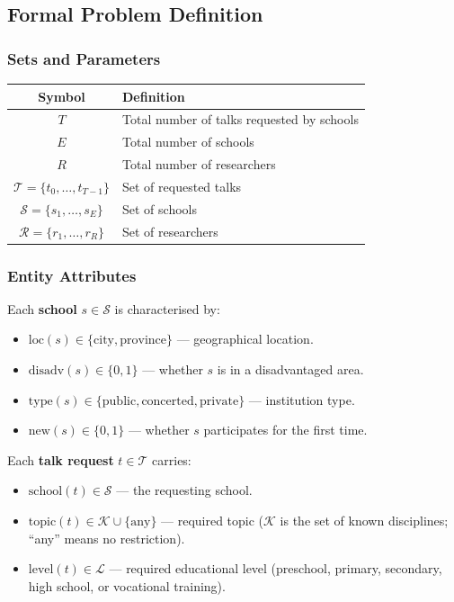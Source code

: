 \documentclass[12pt, a4paper]{article}
\begin{document}
\subsection{Formal Problem Definition}

\subsubsection{Sets and Parameters}

\begin{center}
\renewcommand{\arraystretch}{1.3}
\begin{tabular}{cl}
  \toprule
  \textbf{Symbol} & \textbf{Definition} \\
  \midrule
  $T$ & Total number of talks requested by schools \\
  $E$ & Total number of schools \\
  $R$ & Total number of researchers \\
  $\mathcal{T} = \{t_0, \ldots, t_{T-1}\}$ & Set of requested talks \\
  $\mathcal{S} = \{s_1, \ldots, s_E\}$     & Set of schools \\
  $\mathcal{R} = \{r_1, \ldots, r_R\}$     & Set of researchers \\
  \bottomrule
\end{tabular}
\end{center}

\subsubsection{Entity Attributes}

Each \textbf{school} $s \in \mathcal{S}$ is characterised by:
\begin{itemize}[itemsep=0.1em]
  \item $\text{loc}(s) \in \{\text{city}, \text{province}\}$ — geographical location.
  \item $\text{disadv}(s) \in \{0,1\}$ — whether $s$ is in a disadvantaged area.
  \item $\text{type}(s) \in \{\text{public}, \text{concerted}, \text{private}\}$ — institution type.
  \item $\text{new}(s) \in \{0,1\}$ — whether $s$ participates for the first time.
\end{itemize}

Each \textbf{talk request} $t \in \mathcal{T}$ carries:
\begin{itemize}[itemsep=0.1em]
  \item $\text{school}(t) \in \mathcal{S}$ — the requesting school.
  \item $\text{topic}(t) \in \mathcal{K} \cup \{\text{any}\}$ — required topic ($\mathcal{K}$
        is the set of known disciplines; ``any'' means no restriction).
  \item $\text{level}(t) \in \mathcal{L}$ — required educational level
        (preschool, primary, secondary, high school, or vocational training).
\end{itemize}
\end{document}
